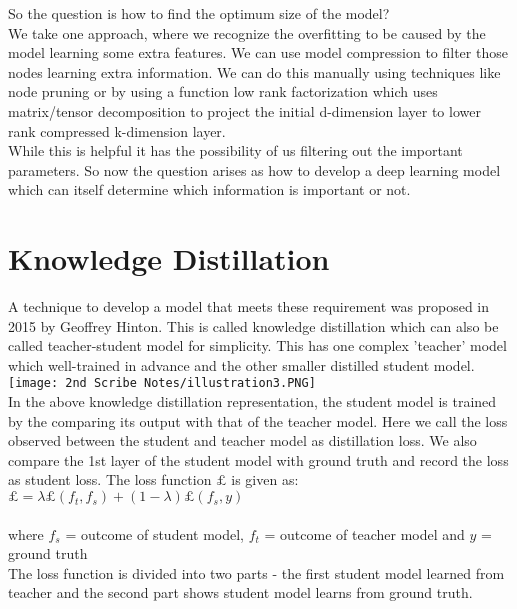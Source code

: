 \documentclass[12pt]{article}
\begin{document}
    So the question is how to find the optimum size of the model?
    \\
    We take one approach, where we recognize the overfitting to be caused by the model learning some extra features. We can use model compression to filter those nodes learning extra information. We can do this manually using techniques like node pruning or by using a function low rank factorization which uses matrix/tensor decomposition to project the initial d-dimension layer to lower rank compressed k-dimension layer.\\
    
    While this is helpful it has the possibility of us filtering out the important parameters. So now the question arises as how to develop a deep learning model which can itself determine which information is important or not.
    \section{Knowledge Distillation}
    A technique to develop a model that meets these requirement was proposed in 2015 by Geoffrey Hinton. This is called knowledge distillation which can also be called teacher-student model for simplicity. This has one complex 'teacher' model which well-trained in advance and the other smaller distilled student model.\\
    
    \texttt{[image: 2nd Scribe Notes/illustration3.PNG]} 
    \\
    
    In the above knowledge distillation representation, the student model is trained by the comparing its output with that of the teacher model. Here we call the loss observed between the student  and teacher model as distillation loss. We also compare the 1st layer of the student model with ground truth and record the loss as student loss. The loss function ${\pounds}$ is given as: \\
    
    ${\pounds} = {\lambda}{\pounds}(f_t,f_s)+(1-{\lambda}){\pounds}(f_s,y)$\\
    \\where $f_s$ = outcome of student model, $f_t$ = outcome of teacher model and $y$ = ground truth\\
    
    The loss function is divided into two parts - the first student model learned from teacher and the second part shows student model learns from ground truth.\\
    
\end{document}
